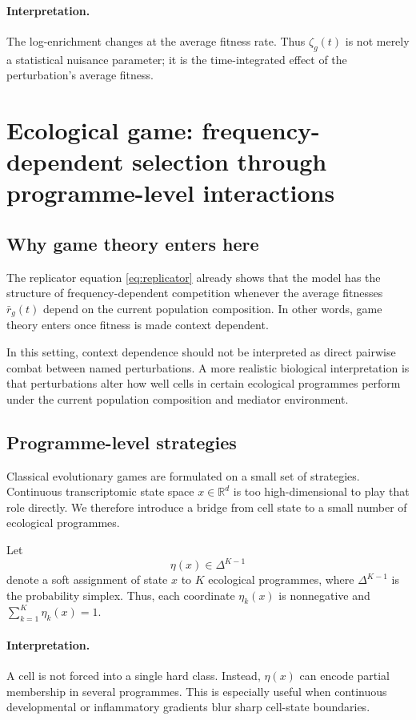 \documentclass[11pt]{article}
\newcommand{\R}{\mathbb{R}}
\newcommand{\1}{\mathbf{1}}
\theoremstyle{plain}
\begin{document}
\paragraph{Interpretation.}
The log-enrichment changes at the average fitness rate. Thus $\zeta_g(t)$ is not merely a statistical nuisance parameter; it is the time-integrated effect of the perturbation's average fitness.

\section{Ecological game: frequency-dependent selection through programme-level interactions}

\subsection{Why game theory enters here}

The replicator equation \eqref{eq:replicator} already shows that the model has the structure of frequency-dependent competition whenever the average fitnesses $\bar r_g(t)$ depend on the current population composition. In other words, game theory enters once fitness is made context dependent.

In this setting, context dependence should not be interpreted as direct pairwise combat between named perturbations. A more realistic biological interpretation is that perturbations alter how well cells in certain ecological programmes perform under the current population composition and mediator environment.

\subsection{Programme-level strategies}

Classical evolutionary games are formulated on a small set of strategies. Continuous transcriptomic state space $x\in\R^d$ is too high-dimensional to play that role directly. We therefore introduce a bridge from cell state to a small number of ecological programmes.

Let
\begin{equation}
\eta(x) \in \Delta^{K-1}
\label{eq:eta_simplex}
\end{equation}
denote a soft assignment of state $x$ to $K$ ecological programmes, where $\Delta^{K-1}$ is the probability simplex. Thus, each coordinate $\eta_k(x)$ is nonnegative and $\sum_{k=1}^K \eta_k(x)=1$.

\paragraph{Interpretation.}
A cell is not forced into a single hard class. Instead, $\eta(x)$ can encode partial membership in several programmes. This is especially useful when continuous developmental or inflammatory gradients blur sharp cell-state boundaries.
\end{document}

